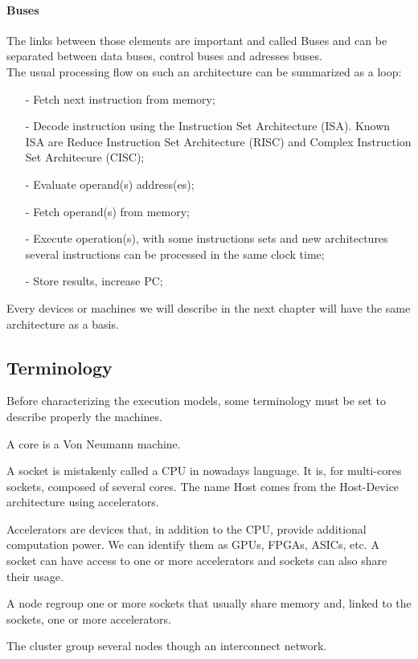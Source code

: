 \paragraph{Buses}
The links between those elements are important and called Buses and can be separated between data buses, control buses and adresses buses.\\

The usual processing flow on such an architecture can be summarized as a loop: 
\begin{itemize}[noitemsep,nolistsep]
\item[-] Fetch next instruction from memory;
\item[-] Decode instruction using the Instruction Set Architecture (ISA). Known ISA are Reduce Instruction Set Architecture (RISC) and Complex Instruction Set Architecure (CISC);
\item[-] Evaluate operand(s) address(es);
\item[-] Fetch operand(s) from memory;
\item[-] Execute operation(s), with some instructions sets and new architectures several instructions can be processed in the same clock time;
\item[-] Store results, increase PC; 
\end{itemize}

Every devices or machines we will describe in the next chapter will have the same architecture as a basis. 

\subsection{Terminology}
Before characterizing the execution models, some terminology must be set to describe properly the machines. 

\begin{description}
	\item[Core:] A core is a Von Neumann machine. 
	\item[Socket/Host:] A socket is mistakenly called a CPU in nowadays language. It is, for multi-cores sockets, composed of several cores. The name Host comes from the Host-Device architecture using accelerators. 
	\item[Accelerators/Devices:] Accelerators are devices that, in addition to the CPU, provide additional computation power. We can identify them as GPUs, FPGAs, ASICs, etc. A socket can have access to one or more accelerators and sockets can also share their usage. 
	\item[Node:] A node regroup one or more sockets that usually share memory and, linked to the sockets, one or more accelerators. 
	\item[Cluster/Supercomputer] The cluster group several nodes though an interconnect network.
\end{description}

